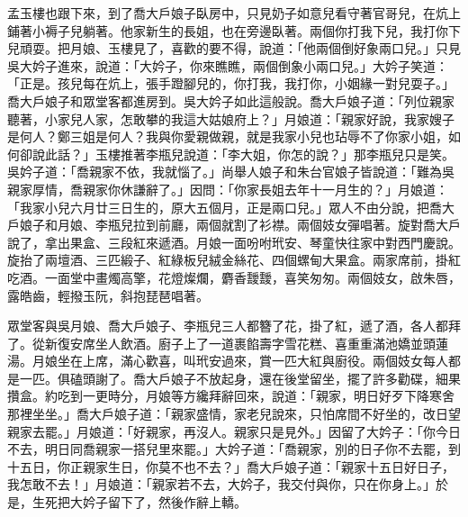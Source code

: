 孟玉樓也跟下來，到了喬大戶娘子臥房中，只見奶子如意兒看守著官哥兒，在炕上鋪著小褥子兒躺著。他家新生的長姐，也在旁邊臥著。兩個你打我下兒，我打你下兒頑耍。把月娘、玉樓見了，喜歡的要不得，說道：「他兩個倒好象兩口兒。」只見吳大妗子進來，說道：「大妗子，你來瞧瞧，兩個倒象小兩口兒。」大妗子笑道：「正是。孩兒每在炕上，張手蹬腳兒的，你打我，我打你，小姻緣一對兒耍子。」喬大戶娘子和眾堂客都進房到。吳大妗子如此這般說。喬大戶娘子道：「列位親家聽著，小家兒人家，怎敢攀的我這大姑娘府上？」月娘道：「親家好說，我家嫂子是何人？鄭三姐是何人？我與你愛親做親，就是我家小兒也玷辱不了你家小姐，如何卻說此話？」玉樓推著李瓶兒說道：「李大姐，你怎的說？」那李瓶兒只是笑。吳妗子道：「喬親家不依，我就惱了。」尚舉人娘子和朱台官娘子皆說道：「難為吳親家厚情，喬親家你休謙辭了。」因問：「你家長姐去年十一月生的？」月娘道：「我家小兒六月廿三日生的，原大五個月，正是兩口兒。」眾人不由分說，把喬大戶娘子和月娘、李瓶兒拉到前廳，兩個就割了衫襟。兩個妓女彈唱著。旋對喬大戶說了，拿出果盒、三段紅來遞酒。月娘一面吩咐玳安、琴童快往家中對西門慶說。旋抬了兩壇酒、三匹緞子、紅綠板兒絨金絲花、四個螺甸大果盒。兩家席前，掛紅吃酒。一面堂中畫燭高擎，花燈燦爛，麝香靉靉，喜笑匆匆。兩個妓女，啟朱唇，露皓齒，輕撥玉阮，斜抱琵琶唱著。

眾堂客與吳月娘、喬大戶娘子、李瓶兒三人都簪了花，掛了紅，遞了酒，各人都拜了。從新復安席坐人飲酒。廚子上了一道裹餡壽字雪花糕、喜重重滿池嬌並頭蓮湯。月娘坐在上席，滿心歡喜，叫玳安過來，賞一匹大紅與廚役。兩個妓女每人都是一匹。俱磕頭謝了。喬大戶娘子不放起身，還在後堂留坐，擺了許多勸碟，細果攢盒。約吃到一更時分，月娘等方纔拜辭回來，說道：「親家，明日好歹下降寒舍那裡坐坐。」喬大戶娘子道：「親家盛情，家老兒說來，只怕席間不好坐的，改日望親家去罷。」月娘道：「好親家，再沒人。親家只是見外。」因留了大妗子：「你今日不去，明日同喬親家一搭兒里來罷。」大妗子道：「喬親家，別的日子你不去罷，到十五日，你正親家生日，你莫不也不去？」喬大戶娘子道：「親家十五日好日子，我怎敢不去！」月娘道：「親家若不去，大妗子，我交付與你，只在你身上。」於是，生死把大妗子留下了，然後作辭上轎。

